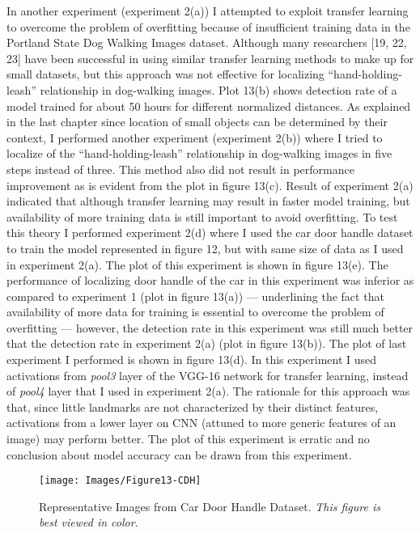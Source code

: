 \documentclass [11pt,letterpaper ,twoside ,openany ]{report}
\begin{document}
    In another experiment (experiment 2(a)) I attempted to exploit transfer learning to overcome the problem of overfitting because of insufficient training data in the Portland State Dog Walking Images dataset. Although many researchers [19, 22, 23] have been successful in using similar transfer learning methods to make up for small datasets, but this approach was not effective for localizing ``hand-holding-leash'' relationship in dog-walking images. Plot 13(b) shows detection rate of a model trained for about 50 hours for different normalized distances. As explained in the last chapter since location of small objects can be determined by their context, I performed another experiment (experiment 2(b)) where I tried to localize of the ``hand-holding-leash'' relationship in dog-walking images in five steps instead of three. This method also did not result in performance improvement as is evident from the plot in figure 13(c). Result of experiment 2(a) indicated that although transfer learning may result in faster model training, but availability of more training data is still important to avoid overfitting. To test this theory I performed experiment 2(d) where I used the car door handle dataset to train the model represented in figure 12, but with same size of data as I used in experiment 2(a). The plot of this experiment is shown in figure 13(e). The performance of localizing door handle of the car in this experiment was inferior as compared to experiment 1 (plot in figure 13(a)) --- underlining the fact that availability of more data for training is essential to overcome the problem of overfitting --- however, the detection rate in this experiment was still much better that the detection rate in experiment 2(a) (plot in figure 13(b)). The plot of last experiment I performed is shown in figure 13(d). In this experiment I used activations from \textit{pool3} layer of the VGG-16 network for transfer learning, instead of \textit{pool4} layer that I used in experiment 2(a). The rationale for this approach was that, since little landmarks are not characterized by their distinct features, activations from a lower layer on CNN (attuned to more generic features of an image) may perform better. The plot of this experiment is erratic and no conclusion about model accuracy can be drawn from this experiment. 

    \begin{figure}[h]
      \centering
      \texttt{[image: Images/Figure13-CDH]}
      \caption{Representative Images from Car Door Handle Dataset. \textit{This figure is best viewed in color.}}
      \label{fig:cdh}
    \end{figure}        
\end{document}
